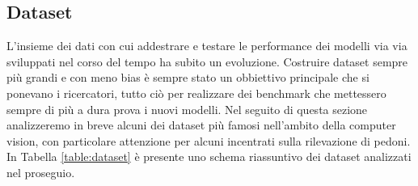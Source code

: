 \subsection{Dataset}
L'insieme dei dati con cui addestrare e testare le performance dei modelli via via sviluppati nel corso del tempo ha subito un evoluzione. Costruire dataset sempre più grandi e con meno bias è sempre stato un obbiettivo principale che si ponevano i ricercatori, tutto ciò per realizzare dei benchmark che mettessero sempre di più a dura prova i nuovi modelli. Nel seguito di questa sezione analizzeremo in breve alcuni dei dataset più famosi nell'ambito della computer vision, con particolare attenzione per alcuni incentrati sulla rilevazione di pedoni. In Tabella \ref{table:dataset} è presente uno schema riassuntivo dei dataset analizzati nel proseguio.


